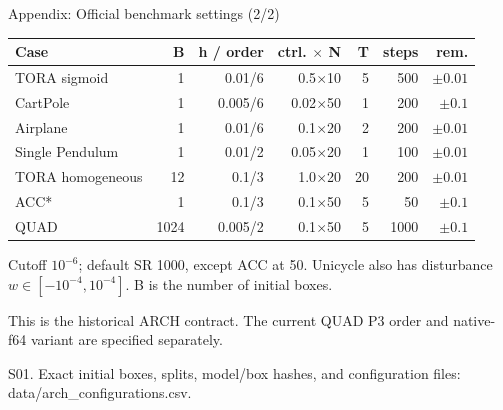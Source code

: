 \documentclass[aspectratio=169,11pt]{beamer}
\newcommand{\src}[1]{\par\vfill{\fontsize{7}{9}\selectfont\color{gray}#1\par}}
\begin{document}
\begin{frame}[t]{Appendix: Official benchmark settings (2/2)}
\relax
\relax
{\footnotesize\setlength{\tabcolsep}{3.2pt}\renewcommand{\arraystretch}{1.18}
\noindent\begin{tabular*}{\linewidth}{@{\extracolsep{\fill}}lrrrrrr@{}}\toprule
\textbf{Case} & \textbf{B} & \textbf{h / order} & \textbf{ctrl. \(\times\) N} & \textbf{T} & \textbf{steps} & \textbf{rem.}\\ \midrule
TORA sigmoid & 1 & 0.01/6 & 0.5\(\times\)10 & 5 & 500 & \(\pm0.01\)\\
CartPole & 1 & 0.005/6 & 0.02\(\times\)50 & 1 & 200 & \(\pm0.1\)\\
Airplane & 1 & 0.01/6 & 0.1\(\times\)20 & 2 & 200 & \(\pm0.01\)\\
Single Pendulum & 1 & 0.01/2 & 0.05\(\times\)20 & 1 & 100 & \(\pm0.01\)\\
TORA homogeneous & 12 & 0.1/3 & 1.0\(\times\)20 & 20 & 200 & \(\pm0.01\)\\
ACC* & 1 & 0.1/3 & 0.1\(\times\)50 & 5 & 50 & \(\pm0.1\)\\
QUAD & 1024 & 0.005/2 & 0.1\(\times\)50 & 5 & 1000 & \(\pm0.1\)\\
\bottomrule\end{tabular*}\par{}}\vspace{0.3cm}Cutoff \(10^{-6}\); default SR 1000, except ACC at 50. Unicycle also has disturbance \(w\in[-10^{-4},10^{-4}]\). B is the number of initial boxes.\par{}This is the historical ARCH contract. The current QUAD P3 order and native-f64 variant are specified separately.
\src{S01. Exact initial boxes, splits, model/box hashes, and configuration files: data/arch\_configurations.csv.}
\end{frame}
\end{document}
